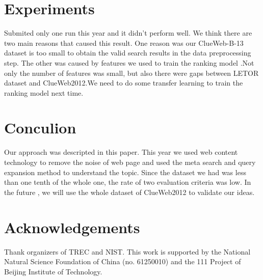 \documentclass[runningheads,a4paper]{llncs}
\begin{document}
\section{Experiments}

Submited only one run this year and it didn't perform well. We think there are two main reasons that caused this result. One reason was our ClueWeb-B-13 dataset is too small to obtain the valid search results in the data preprocessing step. The other  was caused by features we used to train the ranking model .Not only the number of features was small, but also there were gaps between LETOR dataset and ClueWeb2012.We need to do some transfer learning  to train the ranking model next time.

\section{Conculion}

Our approach was descripted in this paper. This year we used web content technology to remove the noise of web page and used the meta search and query expansion method to understand the topic. Since the dataset we had was less than one tenth of the whole one,  the rate of two evaluation criteria was low. In the future , we will use the whole dataset of ClueWeb2012 to validate our ideas.

\section{Acknowledgements}

Thank organizers of TREC and NIST. This work is supported by the National Natural Science Foundation of China (no. 61250010) and  the 111 Project of Beijing Institute of Technology.
\end{document}
